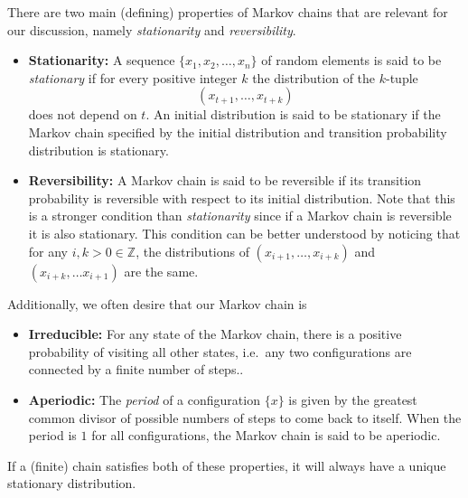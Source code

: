 \documentclass[../main.tex]{subfiles}
\begin{document}
There are two main (defining) properties of Markov chains that are relevant for our discussion, namely
\emph{stationarity} and \emph{reversibility}.
%
\begin{itemize}
  \item \textbf{Stationarity:} A sequence $\{x_1, x_2, \ldots, x_n\}$ of random elements is said to be
    \emph{stationary} if for every positive integer $k$ the distribution of the $k$-tuple
    \begin{equation*}
      (x_{t+1}, \ldots, x_{t+k})
    \end{equation*}
    does not depend on $t$. An initial distribution is said to be stationary if the Markov chain specified by the
    initial distribution and transition probability distribution is stationary. 
  \item \textbf{Reversibility:} A Markov chain is said to be reversible if its transition probability is reversible
    with respect to its initial distribution. Note that this is a stronger condition than \emph{stationarity} since if
    a Markov chain is reversible it is also stationary. This condition can be better understood by noticing that for
    any $i, k  > 0 \in \mathbb{Z}$, the distributions of $(x_{i+1}, \ldots, x_{i+k})$ and $(x_{i+k}, \ldots x_{i+1})$
    are the same.
\end{itemize}
%
Additionally, we often desire that our Markov chain is
\begin{itemize}
  \item \textbf{Irreducible:} For any state of the Markov chain, there is a positive probability of visiting all other
    states, i.e.\ any two configurations are connected by a finite number of steps..
  \item \textbf{Aperiodic:} The \emph{period} of a configuration $\{x\}$ is given by the greatest common divisor of
    possible numbers of steps to come back to itself. When the period is $1$ for all configurations, the Markov chain
    is said to be aperiodic.
\end{itemize}
If a (finite) chain satisfies both of these properties, it will always have a unique stationary distribution.
\end{document}
